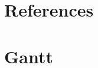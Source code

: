 \documentclass[journal,10pt,onecolumn,compsoc]{IEEEtran} \usepackage[margin=1.0in]{geometry} \usepackage{pdfpages} \usepackage{graphicx}
\begin{document}
\newpage
\section{References}
\newpage

\section{Gantt}
	\begin{minipage}{\textwidth}
		\\
	\end{minipage}
\end{document}
